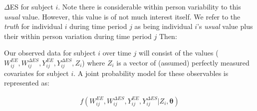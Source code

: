 \documentclass[11pt]{article}\usepackage[]{graphicx}\usepackage[]{color}
\begin{document}
$\Delta$ES for subject $i$. Note there is considerable within person variability to this \emph{usual} value. However, this value is of not much interest itself. We refer to the \emph{truth} for individual $i$ during time period $j$ as being individual $i$'s \emph{usual} value plus their within person variation during time period $j$ Then:


%  

 
 Our observed data for subject $i$ over time $j$ will consist of the values ({\bf$W_{ij}^{EE},W_{ij}^{\Delta ES}, Y_{ij}^{EE},Y_{ij}^{\Delta ES}, Z_i$}) where $Z_i$ is a vector of (assumed) perfectly measured covariates for subject $i$. A joint probability model for these observables is represented as:

\begin{align}
  f(W_{ij}^{EE},W_{ij}^{\Delta ES}, Y_{ij}^{EE},Y_{ij}^{\Delta ES}|Z_i,\boldsymbol{\theta})
  \label{fullmodel}
\end{align}
\end{document}
